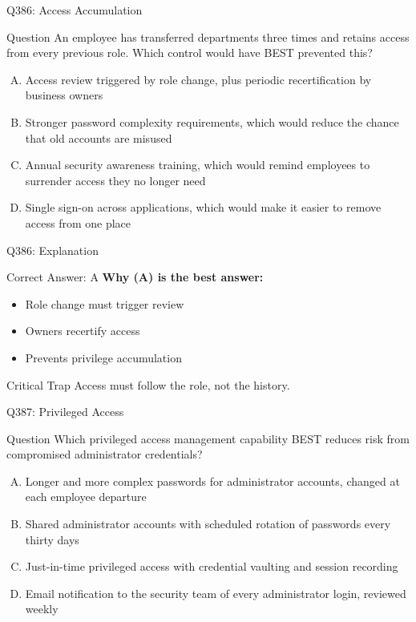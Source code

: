 \documentclass{beamer}
\begin{document}
	\begin{frame}{Q386: Access Accumulation}
		\begin{block}{Question}
			\small An employee has transferred departments three times and retains access from every previous role. Which control would have BEST prevented this?
		\end{block}
		\begin{enumerate}[(A)]
			\footnotesize
			\item Access review triggered by role change, plus periodic recertification by business owners
			\item Stronger password complexity requirements, which would reduce the chance that old accounts are misused
			\item Annual security awareness training, which would remind employees to surrender access they no longer need
			\item Single sign-on across applications, which would make it easier to remove access from one place
		\end{enumerate}
	\end{frame}
	
	\begin{frame}{Q386: Explanation}
		\begin{block}{Correct Answer: A}
			\textbf{Why (A) is the best answer:}
			\begin{itemize}
				\item Role change must trigger review
				\item Owners recertify access
				\item Prevents privilege accumulation
			\end{itemize}
		\end{block}
		\begin{alertblock}{Critical Trap}
			Access must follow the role, not the history.
		\end{alertblock}
	\end{frame}
	
	\begin{frame}{Q387: Privileged Access}
		\begin{block}{Question}
			\small Which privileged access management capability BEST reduces risk from compromised administrator credentials?
		\end{block}
		\begin{enumerate}[(A)]
			\footnotesize
			\item Longer and more complex passwords for administrator accounts, changed at each employee departure
			\item Shared administrator accounts with scheduled rotation of passwords every thirty days
			\item Just-in-time privileged access with credential vaulting and session recording
			\item Email notification to the security team of every administrator login, reviewed weekly
		\end{enumerate}
	\end{frame}
	
\end{document}
